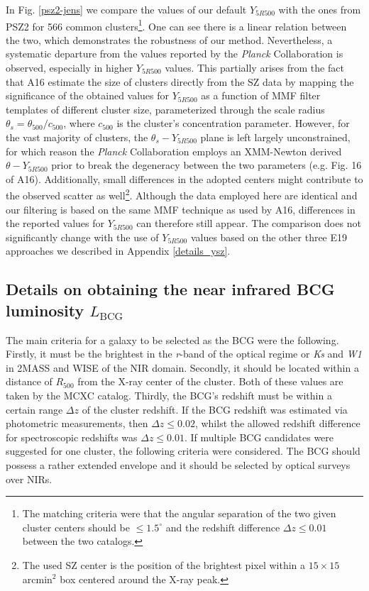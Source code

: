 \documentclass{aa}   %
\begin{document}
In Fig. \ref{psz2-jens} we compare the values of our default $Y_{5R500}$ with the ones from PSZ2 for 566 common clusters\footnote{The matching criteria were that the angular separation of the two given cluster centers should be $\leq 1.5^{\circ}$ and the redshift difference $\Delta z\leq 0.01$ between the two catalogs.}. One can see there is a linear relation between the two, which demonstrates the robustness of our method. Nevertheless, a systematic departure from the values reported by the \textit{Planck} Collaboration is observed, especially in higher $Y_{5R500}$ values. This partially arises from the fact that A16 estimate the size of clusters directly from the SZ data by mapping the significance of the obtained values for $Y_{5R500}$ as a function of MMF filter templates of different cluster size, parameterized through the scale radius ${\theta}_s={\theta}_{500}/c_{500}$, where $c_{500}$ is the cluster's concentration parameter. However, for the vast majority of clusters, the $\theta_s-Y_{5R500}$ plane is left largely unconstrained, for which reason the \textit{Planck} Collaboration employs an XMM-Newton derived $\theta-Y_{5R500}$ prior to break the degeneracy between the two parameters (e.g. Fig. 16 of A16). Additionally, small differences in the adopted centers might contribute to the observed scatter as well\footnote{The used SZ center is the position of the brightest pixel within a $15\times 15$ arcmin$^2$ box centered around the X-ray peak.}. Although the data employed here are identical and our filtering is based on the same MMF technique as used by A16, differences in the reported values for $Y_{5R500}$ can therefore still appear. The comparison does not significantly change with the use of $Y_{5R500}$ values based on the other three E19 approaches we described in Appendix \ref{details_ysz}. 

\subsection{Details on obtaining the near infrared BCG luminosity $L_{\text{BCG}}$}\label{bcg_select}

The main criteria for a galaxy to be selected as the BCG were the following. Firstly, it must be the brightest in the \textit{r}-band of the optical regime or \textit{Ks} and \textit{W1} in 2MASS and WISE of the NIR domain. Secondly, it should be located within a distance of $R_{500}$ from the X-ray center of the cluster. Both of these values are taken by the MCXC catalog. Thirdly, the BCG's redshift must be within a certain range $\Delta z$ of the cluster redshift. If the BCG redshift was estimated via photometric measurements, then $\Delta z\leq 0.02$, whilst the allowed redshift difference for spectroscopic redshifts was $\Delta z\leq 0.01$. If multiple BCG candidates were suggested for one cluster, the following criteria were considered. The BCG should possess a rather extended envelope and it should be selected by optical surveys over NIRs. 
\end{document}
